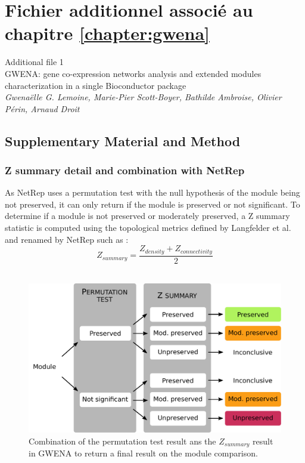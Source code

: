 \chapter{Fichier additionnel associé au chapitre \ref{chapter:gwena}}

\begin{center}
{\huge Additional file 1}\\
\hfill \break
{\large GWENA: gene co-expression networks analysis and extended modules characterization in a single Bioconductor package} \\ 
\hfill \break
\textit{Gwenaëlle G. Lemoine, Marie-Pier Scott-Boyer, Bathilde Ambroise, Olivier Périn, Arnaud Droit}
\end{center}


\section{Supplementary Material and Method}
\subsection{Z summary detail and combination with NetRep}
\label{supp:supp_z_summary_detail}

As NetRep uses a permutation test with the null hypothesis of the module being not preserved, it can only return if the module is preserved or not significant. To determine if a module is not preserved or moderately preserved, a Z summary statistic is computed using the topological metrics defined by Langfelder et al. \cite{Langfelder2011} and renamed by NetRep \cite{Ritchie2016} such as : \\

\[Z_{summary} = \frac{Z_{density} + Z_{connectivity}}{2}\] \\

\begin{figure}[ht]
    \includegraphics[width=\textwidth, center]{img/annexe_add_file_GWENA/additional_file_figure_1.pdf}
    \caption{Combination of the permutation test result ans the $Z_{summary}$ result in GWENA to return a final result on the module comparison.}
    \label{fig:supp_fig_comparison_schema_conclusion}
\end{figure}


